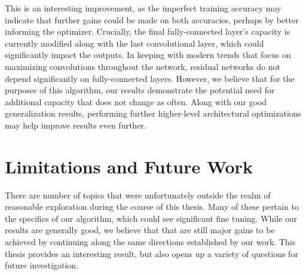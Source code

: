 This is an interesting improvement, as the imperfect training accuracy may indicate that further gains could be made on both accuracies, perhaps by better informing the optimizer.
Crucially, the final fully-connected layer's capacity is currently modified along with the last convolutional layer, which could significantly impact the outputs.
In keeping with modern trends that focus on maximizing convolutions throughout the network, residual networks do not depend significantly on fully-connected layers. 
However, we believe that for the purposes of this algorithm, our results demonstrate the potential need for additional capacity that does not change as often.
Along with our good generalization results, performing further higher-level architectural optimizations may help improve results even further. 

\section{Limitations and Future Work}
There are number of topics that were unfortunately outside the realm of reasonable exploration during the course of this thesis.
Many of these pertain to the specifics of our algorithm, which could see significant fine tuning.
While our results are generally good, we believe that that are still major gains to be achieved by continuing along the same directions established by our work.
This thesis provides an interesting result, but also opens up a variety of questions for future investigation.

